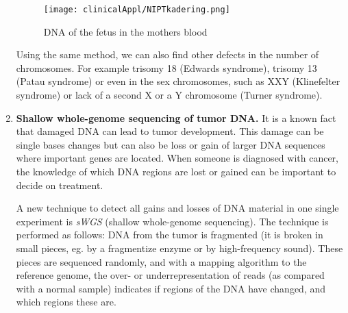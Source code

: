 \begin{enumerate}
	\begin{figure}[H]
		\centering
		\texttt{[image: clinicalAppl/NIPTkadering.png]}
		\caption{DNA of the fetus in the mothers blood}
		\label{fig:NIPT}
	\end{figure}
	
	Using the same method, we can also find other defects in the number of chromosomes. For example trisomy 18 (Edwards syndrome), trisomy 13 (Patau syndrome) or even in the sex chromosomes, such as XXY (Klinefelter syndrome) or lack of a second X or a Y chromosome (Turner syndrome).
	
	\item \textbf{Shallow whole-genome sequencing of tumor DNA.}\newline
	It is a known fact that damaged DNA can lead to tumor development. This damage can be single bases changes but can also be loss or gain of larger DNA sequences where important genes are located. When someone is diagnosed with cancer, the knowledge of which DNA regions are lost or gained can be important to decide on treatment. 
	
	A new technique to detect all gains and losses of DNA material in one single experiment is \emph{sWGS} (shallow whole-genome sequencing). The technique is performed as follows: DNA from the tumor is fragmented (it is broken in small pieces, eg. by a fragmentize enzyme or by high-frequency sound). These pieces are sequenced randomly, and with a mapping algorithm to the reference genome, the over- or underrepresentation of reads (as compared with a normal sample) indicates if regions of the DNA have changed, and which regions these are.
\end{enumerate}



